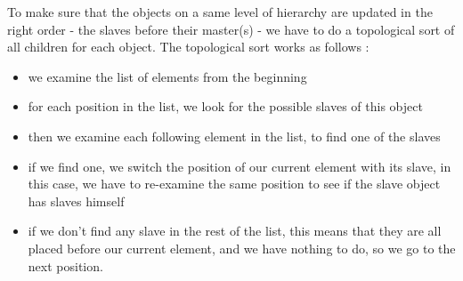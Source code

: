 \documentclass[a4paper]{article}
\begin{document}
%
%    
%

To make sure that the objects on a same level of hierarchy are updated in the right order - the slaves before their master(s) - we have to do a topological sort of all children for each object. The topological sort works as follows :
\begin{itemize}
  \item we examine the list of elements from the beginning
  \item for each position in the list, we look for the possible slaves of this object
  \item then we examine each following element in the list, to find one of the slaves
  \item if we find one, we switch the position of our current element with its slave, in this case, we have to re-examine the same position to see if the slave object has slaves himself
  \item if we don't find any slave in the rest of the list, this means that they are all placed before our current element, and we have nothing to do, so we go to the next position.
\end{itemize}
\end{document}
